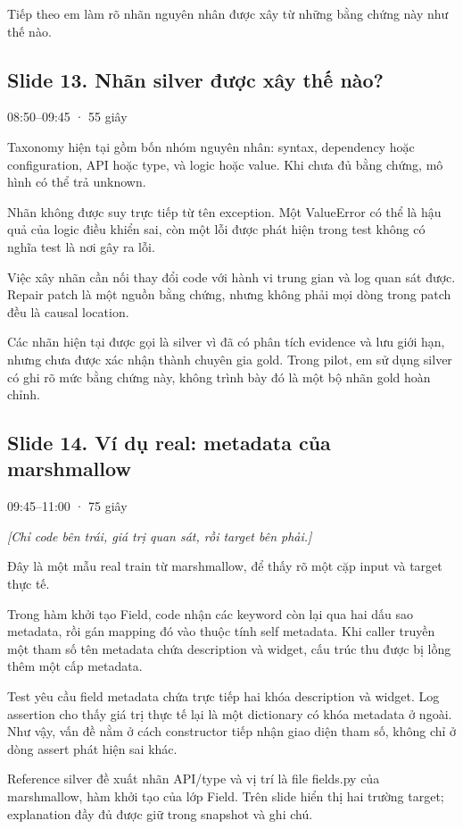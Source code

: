 \documentclass[12pt,a4paper]{article}
\begin{document}
Tiếp theo em làm rõ nhãn nguyên nhân được xây từ những bằng chứng này như thế nào.

\clearpage
\subsection*{Slide 13. Nhãn silver được xây thế nào?}
{\small\color{gray}08:50–09:45 · 55 giây}\par
Taxonomy hiện tại gồm bốn nhóm nguyên nhân: syntax, dependency hoặc configuration, API hoặc type, và logic hoặc value. Khi chưa đủ bằng chứng, mô hình có thể trả unknown.

Nhãn không được suy trực tiếp từ tên exception. Một ValueError có thể là hậu quả của logic điều khiển sai, còn một lỗi được phát hiện trong test không có nghĩa test là nơi gây ra lỗi.

Việc xây nhãn cần nối thay đổi code với hành vi trung gian và log quan sát được. Repair patch là một nguồn bằng chứng, nhưng không phải mọi dòng trong patch đều là causal location.

Các nhãn hiện tại được gọi là silver vì đã có phân tích evidence và lưu giới hạn, nhưng chưa được xác nhận thành chuyên gia gold. Trong pilot, em sử dụng silver có ghi rõ mức bằng chứng này, không trình bày đó là một bộ nhãn gold hoàn chỉnh.

\subsection*{Slide 14. Ví dụ real: metadata của marshmallow}
{\small\color{gray}09:45–11:00 · 75 giây}\par
{\itshape\color{gray}[Chỉ code bên trái, giá trị quan sát, rồi target bên phải.]}\par
Đây là một mẫu real train từ marshmallow, để thấy rõ một cặp input và target thực tế.

Trong hàm khởi tạo Field, code nhận các keyword còn lại qua hai dấu sao metadata, rồi gán mapping đó vào thuộc tính self metadata. Khi caller truyền một tham số tên metadata chứa description và widget, cấu trúc thu được bị lồng thêm một cấp metadata.

Test yêu cầu field metadata chứa trực tiếp hai khóa description và widget. Log assertion cho thấy giá trị thực tế lại là một dictionary có khóa metadata ở ngoài. Như vậy, vấn đề nằm ở cách constructor tiếp nhận giao diện tham số, không chỉ ở dòng assert phát hiện sai khác.

Reference silver đề xuất nhãn API/type và vị trí là file fields.py của marshmallow, hàm khởi tạo của lớp Field. Trên slide hiển thị hai trường target; explanation đầy đủ được giữ trong snapshot và ghi chú.
\end{document}
